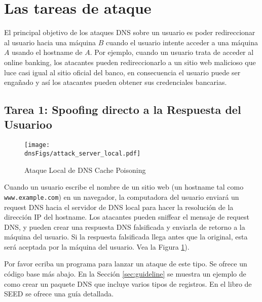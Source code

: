 \section{Las tareas de ataque}

El principal objetivo de los ataques DNS sobre un usuario es poder redireccionar al usuario hacia una máquina $B$ cuando el usuario intente acceder a una máquina $A$ usando el hostname de $A$. Por ejemplo, cuando un usuario trata de acceder al online banking, los atacantes pueden redireccionarlo a un sitio web malicioso que luce casi igual al sitio oficial del banco, en consecuencia el usuario puede ser engañado y así los atacantes pueden obtener sus credenciales bancarias.



\subsection{Tarea 1: Spoofing directo a la Respuesta del Usuarioo}



\begin{figure}[htb]
\centering
\texttt{[image: \\dnsFigs/attack\_server\_local.pdf]}
\caption{Ataque Local de DNS Cache Poisoning}
\label{dns:fig:local_attack}
\end{figure}

Cuando un usuario escribe el nombre de un sitio web (un hostname tal como {\tt
www.example.com}) en un navegador, la computadora del usuario enviará un request DNS hacia el servidor de DNS local para hacer la resolución de la dirección IP del hostname.
Los atacantes pueden sniffear el mensaje de request DNS, y pueden crear una respuesta DNS falsificada y enviarla de retorno a la máquina del usuario. Si la respuesta falsificada llega antes que la original, esta será aceptada por la máquina del usuario.
Vea la Figura \ref{dns:fig:local_attack}). 

Por favor ecriba un programa para lanzar un ataque de este tipo. Se ofrece un código base más abajo. En la Sección \ref{sec:guideline} se muestra un ejemplo de como crear un paquete DNS que incluye varios tipos de registros. En el libro de SEED se ofrece una guía detallada.


